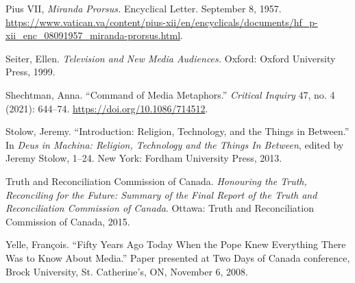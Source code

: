 \documentclass{tufte-handout}
\begin{document}
\begin{hangparas}{.25in}{1}
Pius VII, \emph{Miranda Prorsus.} Encyclical Letter. September 8, 1957.
\url{https://www.vatican.va/content/pius-xii/en/encyclicals/documents/hf_p-xii_enc_08091957_miranda-prorsus.html}.

Seiter, Ellen. \emph{Television and New Media Audiences.} Oxford: Oxford
University Press, 1999.

Shechtman, Anna. ``Command of Media Metaphors.'' \emph{Critical Inquiry}
47, no. 4 (2021): 644--74. \url{https://doi.org/10.1086/714512}.

Stolow, Jeremy. ``Introduction: Religion, Technology, and the Things in
Between.'' In \emph{Deus in Machina: Religion, Technology and the Things
In Between}, edited by Jeremy Stolow, 1--24. New York: Fordham
University Press, 2013.

Truth and Reconciliation Commission of Canada. \emph{Honouring the
Truth, Reconciling for the Future: Summary of the Final Report of the
Truth and Reconciliation Commission of Canada}. Ottawa: Truth and
Reconciliation Commission of Canada, 2015.

Yelle, François. ``Fifty Years Ago Today When the Pope Knew Everything
There Was to Know About Media.'' Paper presented at Two Days of Canada
conference, Brock University, St. Catherine's, ON, November 6, 2008.



\end{hangparas}
\end{document}
